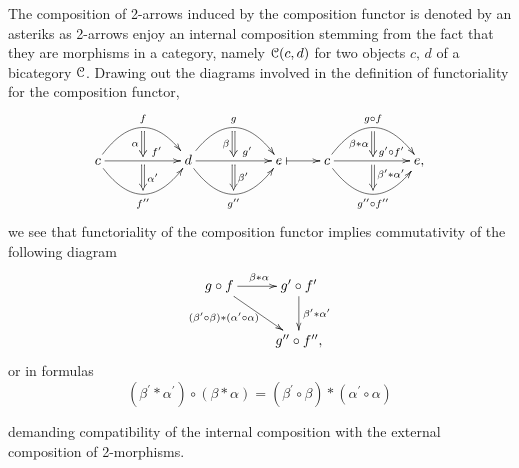     \begin{rem}
      The composition of 2-arrows induced by the composition functor is denoted by an asteriks as 2-arrows enjoy an internal composition stemming from the fact that they are morphisms in a category, namely $\mathcal{C}(c,d)$ for two objects $c,\,d$ of a bicategory $\mathcal{C}$. Drawing out the diagrams involved in the definition of functoriality for the composition functor,
      \begin{gather*}
          \xymatrix{
            c%
              \ar@/^2pc/[rr]^{f}_{}="f" 
              \ar[rr]^{}="f_prime_upper"^(.65){f^\prime}_{}="f_prime_lower"
              \ar@/_2pc/[rr]_{f^\dprime}^{}="f_dprime" 
                \ar@{=>} "f";"f_prime_upper" _{\alpha}
                \ar@{=>} "f_prime_lower";"f_dprime" ^{\alpha^\prime}
            &
            &
            d%
              \ar@/^2pc/[rr]^{g}_{}="g"
              \ar[rr]^{}="g_prime_upper"^(.65){g^\prime}_{}="g_prime_lower"
              \ar@/_2pc/[rr]_{g^\dprime}^{}="g_dprime"
                \ar@{=>} "g";"g_prime_upper" _{\beta}
                \ar@{=>} "g_prime_lower";"g_dprime" ^{\beta^\prime}
            &
            &
            e%
              \ar@{|->}[r]
            &
            c%
              \ar@/^2pc/[rr]^{g \circ f}_{}="gf"
              \ar[rr]^{}="gf_prime_upper"^(.7){g^\prime \circ f^\prime}_{}="gf_prime_lower"
              \ar@/_2pc/[rr]_{g^\dprime \circ f^\dprime}^{}="gf_dprime"
                \ar@{=>} "gf";"gf_prime_upper" _{\beta \ast \alpha}
                \ar@{=>} "gf_prime_lower";"gf_dprime" ^(.4){\beta^\prime \ast \alpha^\prime}
            &&
            e,%
          }
        \end{gather*}
      we see that functoriality of the composition functor implies commutativity of the following diagram
      \begin{gather*}
        \xymatrix{
          g \circ f
            \ar[r]^{\beta \ast \alpha}
            \ar[dr]_(.4){(\beta^\prime \circ \beta) \ast (\alpha^\prime \circ \alpha)}
          &
          g^\prime \circ f^\prime
            \ar[d]^{\beta^\prime \ast \alpha^\prime}
          \\
          &
          g^\dprime \circ f^\dprime,
        }
      \end{gather*}
      or in formulas
      \begin{displaymath}
        (\beta^\prime \ast \alpha^\prime) \circ (\beta \ast \alpha) = (\beta^\prime \circ \beta) \ast (\alpha^\prime \circ \alpha)
      \end{displaymath}

      demanding compatibility of the internal composition with the external composition of 2-morphisms.
    \end{rem}

